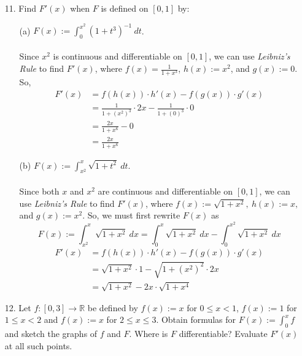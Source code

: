 \documentclass[12pt,letterpaper]{article}
\newcommand{\R}{\mathbb{R}}
\theoremstyle{case}
\theoremstyle{definition}
\begin{document}
\begin{enumerate}
\begin{enumerate}
\begin{enumerate}
			\end{enumerate}
			\item[11.] Find $F'(x)$ when $F$ is defined on $[0,1]$ by:
			\begin{enumerate}
				\item[(a)] $F(x):=\displaystyle\int_{0}^{x^2} (1+t^3)^{-1}\ dt$.
				\\\\Since $x^2$ is continuous and differentiable on $[0,1]$, we can use \textit{Leibniz's Rule} to find $F'(x)$, where $f(x)=\frac{1}{1+x^3}$, $h(x):=x^2$, and $g(x):=0$. So,
				\begin{align*}
					F'(x)&= f(h(x))\cdot h'(x)-f(g(x))\cdot g'(x) \\
					&= \frac{1}{1+(x^2)^3}\cdot 2x - \frac{1}{1+(0)^3}\cdot 0 \\
					&= \frac{2x}{1+x^6}-0 \\
					&= \frac{2x}{1+x^6}
				\end{align*}
				\item[(b)] $F(x):=\displaystyle\int_{x^2}^{x} \sqrt{1+t^2}\ dt$.
				\\\\Since both $x$ and $x^2$ are continuous and differentiable on $[0,1]$, we can use \textit{Leibniz's Rule} to find $F'(x)$, where $f(x):=\sqrt{1+x^2},\ h(x):=x,$ and $g(x):=x^2$. So, we must first rewrite $F(x)$ as
				\[F(x):=\int_{x^2}^{x} \sqrt{1+x^2}\ dx = \int_{0}^{x} \sqrt{1+x^2}\ dx - \int_{0}^{x^2} \sqrt{1+x^2}\ dx\]
				\begin{align*}
					F'(x)&=f(h(x))\cdot h'(x) - f(g(x))\cdot g'(x) \\
					&= \sqrt{1+x^2} \cdot 1 - \sqrt{1+(x^2)^2} \cdot 2x \\
					&= \sqrt{1+x^2} - 2x \cdot \sqrt{1+x^4}
				\end{align*}
			\end{enumerate}
			\item[12.] Let $f:[0,3] \to \R$ be defined by $f(x):=x$ for $0 \leq x < 1$, $f(x):=1$ for $1 \leq x < 2$ and $f(x):=x$ for $2 \leq x \leq 3$. Obtain formulas for $F(x):=\int_{0}^{x} f$ and sketch the graphs of $f$ and $F$. Where is $F$ differentiable? Evaluate $F'(x)$ at all such points.

\end{enumerate}
\end{enumerate}
\end{document}
